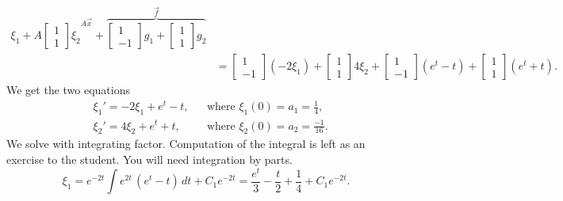 \documentclass{ximera}
\begin{document}
\begin{exampleSol}
\begin{equation*}
\begin{split}
{                \xi_1 +
                A
                \begin{bmatrix}
                    1 \\
                    1
                \end{bmatrix} 
                \xi_2
            }^{A\vec{x}} +
            \overbrace{
                \begin{bmatrix}
                    1 \\
                    -1
                \end{bmatrix} 
                g_1 +
                \begin{bmatrix}
                    1 \\
                    1
                \end{bmatrix} 
                g_2
            }^{\vec{f}}
            \\
            & =
            \begin{bmatrix}
                1 \\
                -1
            \end{bmatrix} 
            (-2\xi_1) +
            \begin{bmatrix}
                1 \\
                1
            \end{bmatrix} 
            4\xi_2 +
            \begin{bmatrix}
                1 \\
                -1
            \end{bmatrix} 
            (e^t - t) +
            \begin{bmatrix}
                1 \\
                1
            \end{bmatrix} 
            (e^t + t) .
        \end{split}
    \end{equation*}
    We get the two equations
    \begin{align*}
        & \xi_1' = -2\xi_1 + e^t -t, & & \text{where } \xi_1(0) = a_1 = \frac{1}{4} , \\
        & \xi_2' = 4\xi_2 + e^t + t, & & \text{where } \xi_2(0) = a_2 = \frac{-1}{16} .
    \end{align*}
        We solve with integrating factor.  Computation of the integral is left as an exercise to the student.  You will need integration by parts.
    \begin{equation*}
    \xi_1 = e^{-2t}\int e^{2t} \, (e^t-t) \, dt + C_1 e^{-2t} = \frac{e^t}{3}-\frac{t}{2}+\frac{1}{4}+C_1 e^{-2t} .

\end{equation*}
\end{exampleSol}
\end{document}
